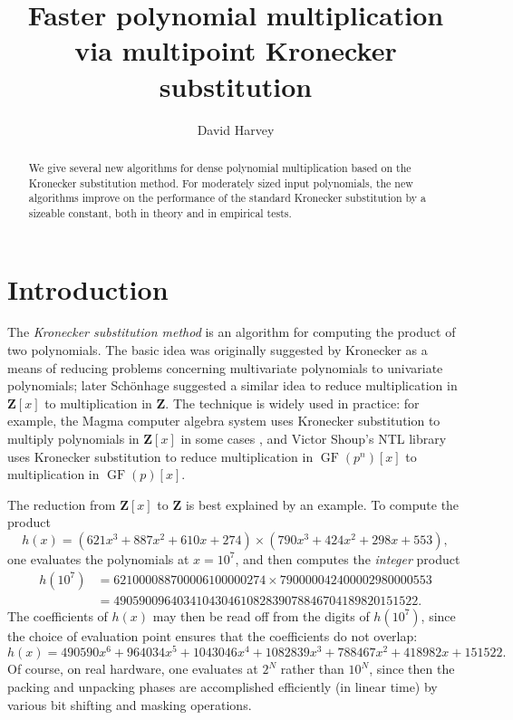 \documentclass{amsart}
\newcommand{\ZZ}{\mathbf{Z}}
\DeclareMathOperator{\GF}{GF}
\theoremstyle{definition}
\theoremstyle{remark}
\begin{document}
\title[Multipoint Kronecker substitution]{Faster polynomial multiplication via multipoint Kronecker substitution}
\author{David Harvey}
\begin{abstract}
We give several new algorithms for dense polynomial multiplication based on the Kronecker substitution method. For moderately sized input polynomials, the new algorithms improve on the performance of the standard Kronecker substitution by a sizeable constant, both in theory and in empirical tests.
\end{abstract}

\maketitle

\section{Introduction}
\label{sec:intro}

The \emph{Kronecker substitution method} is an algorithm for computing the product of two polynomials. The basic idea was originally suggested by Kronecker \cite{kronecker} as a means of reducing problems concerning multivariate polynomials to univariate polynomials; later Sch\"onhage \cite{schonhage} suggested a similar idea to reduce multiplication in $\ZZ[x]$ to multiplication in $\ZZ$. The technique is widely used in practice: for example, the Magma computer algebra system uses Kronecker substitution to multiply polynomials in $\ZZ[x]$ in some cases \cite{magma}, and Victor Shoup's NTL library \cite{ntl} uses Kronecker substitution to reduce multiplication in $\GF(p^n)[x]$ to multiplication in $\GF(p)[x]$.

The reduction from $\ZZ[x]$ to $\ZZ$ is best explained by an example. To compute the product
 \[ h(x) = (621x^3 + 887x^2 + 610x + 274) \times (790x^3 + 424x^2 + 298x + 553), \]
one evaluates the polynomials at $x = 10^7$, and then computes the \emph{integer} product
\begin{align*}
 h(10^7) & = 621000088700006100000274 \times 790000042400002980000553 \\
   & = 490590096403410430461082839078846704189820151522.
\end{align*}
The coefficients of $h(x)$ may then be read off from the digits of $h(10^7)$, since the choice of evaluation point ensures that the coefficients do not overlap:
 \[ h(x) = 490590x^6 + 964034x^5 + 1043046x^4 + 1082839x^3 + 788467x^2 + 418982x + 151522. \]
Of course, on real hardware, one evaluates at $2^N$ rather than $10^N$, since then the packing and unpacking phases are accomplished efficiently (in linear time) by various bit shifting and masking operations.
\end{document}
